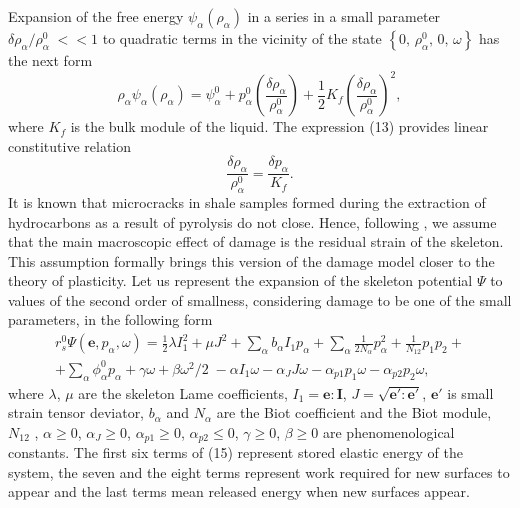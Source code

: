 \documentclass[article,authoryear,jpm]{beg_39}             %
\begin{document}
Expansion of the free energy
${{\psi }_{\alpha }}\left( {{\rho }_{\alpha }} \right)$
in a series in a small parameter
${\delta {{\rho }_{\alpha }}}/{\rho _{\alpha }^{0}}\;<<1$
to quadratic terms in the vicinity of the state
$\left\{ 0,\,\rho_{\alpha }^{0},\,0,\,\omega \right\}$
has the next form
\begin{equation}
{{\rho }_{\alpha }}{{\psi }_{\alpha }}\left( {{\rho }_{\alpha }} \right)=\psi _{\alpha }^{0}+p_{\alpha }^{0}\left( \frac{\delta {{\rho }_{\alpha }}}{\rho _{\alpha }^{0}} \right)+\frac{1}{2}{{K}_{f}}{{\left( \frac{\delta {{\rho }_{\alpha }}}{\rho _{\alpha }^{0}} \right)}^{2}},
\end{equation}
where ${{K}_{f}}$ is the bulk module of the liquid. The expression (13) provides linear constitutive relation
\begin{equation}
\frac{\delta {{\rho }_{\alpha }}}{\rho _{\alpha }^{0}}=\frac{\delta {{p}_{\alpha }}}{{{K}_{f}}}.
\end{equation}
It is known that microcracks in shale samples formed during the extraction of hydrocarbons as a result of pyrolysis do not close.
Hence, following \cite{Kondaurov2002, Izvekov, Izvekov2020}, we assume that the main macroscopic effect of damage is the residual strain of the skeleton.
This assumption formally brings this version of the damage model closer to the theory of plasticity.
Let us represent the expansion of the skeleton potential $\Psi $ to values of the second order of smallness, considering damage to be one of the small parameters, in the following form
\begin{eqnarray}
r_{s}^{0} \Psi (\mathbf{e},{{p}_{\alpha }},\omega )=\frac{1}{2} \lambda I_{1}^{2}+\mu {{J}^{2}}+\sum\limits_{\alpha }{{{b}_{\alpha }}{{I}_{1}}{{p}_{\alpha}}} +\sum\limits_{\alpha }{\frac{1}{2{{N}_{\alpha }}}p_{\alpha }^{2}}+\frac{1}{{{N}_{12}}}{{p}_{1}}{{p}_{2}}+ \nonumber \\ +\sum \limits_{\alpha }{\phi _{\alpha }^{0}{{p}_{\alpha }}}+\gamma \omega +\beta {{{\omega }^{2}}}/{2}\;-\alpha {{I}_{1}}\omega -{{\alpha}_{J}}J \omega -{{\alpha }_{p1}}{{p}_{1}} \omega -{{\alpha }_{p2}}{{p}_{2}} \omega,
\end{eqnarray}
where $\lambda$, $\mu$ are the skeleton Lame coefficients, ${{I}_{1}}=\mathbf{e}:\mathbf{I}$, $J=\sqrt{\mathbf{{e}'}:\mathbf{{e}'}}$, $\mathbf{{e}'}$ is small strain tensor deviator, ${{b}_{\alpha }}$ and ${{N}_{\alpha }}$ are the Biot coefficient and the Biot module, ${{N}_{12}}$ , $\alpha \ge 0$, ${{\alpha }_{J}}\ge 0$, ${{\alpha }_{p1}}\ge 0$, ${{\alpha }_{p2}}\le 0$, $\gamma \ge 0$, $\beta \ge 0$ are phenomenological constants.
The first six terms of (15) represent stored elastic energy of the system, the seven and the eight terms represent work required for new surfaces to appear and the last terms mean released energy when new surfaces appear.
\end{document}
